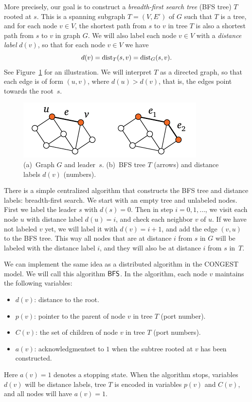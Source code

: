 More precisely, our goal is to construct a \emph{breadth-first search tree} (BFS tree) $T$ rooted at $s$. This is a spanning subgraph $T = (V,E')$ of $G$ such that $T$ is a tree, and for each node $v \in V$, the shortest path from $s$ to $v$ in tree $T$ is also a shortest path from $s$ to $v$ in graph $G$. We will also label each node $v \in V$ with a \emph{distance label} $d(v)$, so that for each node $v \in V$ we have
\[
    d(v) = \operatorname{dist}_T(s,v) = \operatorname{dist}_G(s,v).
\]
See Figure~\ref{fig:bfs} for an illustration. We will interpret $T$ as a directed graph, so that each edge is of form $(u,v)$, where $d(u) > d(v)$, that is, the edges point towards the root~$s$.

\begin{figure}
    \centering
    \includegraphics[page=\PBFS]{figs.pdf}
    \caption{(a)~Graph $G$ and leader~$s$. (b)~BFS tree $T$ (arrows) and distance labels $d(v)$ (numbers).}\label{fig:bfs}
\end{figure}

There is a simple centralized algorithm that constructs the BFS tree and distance labels: breadth-first search. We start with an empty tree and unlabeled nodes. First we label the leader $s$ with $d(s) = 0$. Then in step $i = 0, 1, \dotsc$, we visit each node $u$ with distance label $d(u) = i$, and check each neighbor $v$ of $u$. If we have not labeled $v$ yet, we will label it with $d(v) = i+1$, and add the edge $(v,u)$ to the BFS tree. This way all nodes that are at distance $i$ from $s$ in $G$ will be labeled with the distance label $i$, and they will also be at distance $i$ from $s$ in~$T$.

We can implement the same idea as a distributed algorithm in the CONGEST model. We will call this algorithm $\textup{\sffamily BFS}$. In the algorithm, each node $v$ maintains the following variables:
\begin{itemize}
    \item $d(v)$: distance to the root.
    \item $p(v)$: pointer to the parent of node $v$ in tree $T$ (port number).
    \item $C(v)$: the set of children of node $v$ in tree $T$ (port numbers).
    \item $a(v)$: acknowledgment\mydash set to $1$ when the subtree rooted at $v$ has been constructed.
\end{itemize}
Here $a(v) = 1$ denotes a stopping state. When the algorithm stops, variables $d(v)$ will be distance labels, tree $T$ is encoded in variables $p(v)$ and $C(v)$, and all nodes will have $a(v) = 1$.

